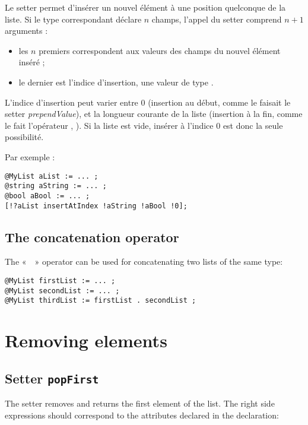 Le setter  permet d'insérer un nouvel élément à une position quelconque de la liste. Si le type  correspondant déclare $n$ champs, l'appel du setter comprend $n+1$ arguments :
\begin{itemize}
  \item les $n$ premiers correspondent aux valeurs des champs du nouvel élément inséré ;
  \item le dernier est l'indice d'insertion, une valeur de type .
\end{itemize}

L'indice d'insertion peut varier entre $0$ (insertion au début, comme le faisait le setter \emph{prependValue}), et la longueur courante de la liste (insertion à la fin, comme le fait l'opérateur \galgas{+=}, ). Si la liste est vide, insérer à l'indice $0$ est donc la seule possibilité.

Par exemple :

\begin{lstlisting}[language=galgas]
@MyList aList := ... ;
@string aString := ... ;
@bool aBool := ... ;
[!?aList insertAtIndex !aString !aBool !0];
\end{lstlisting}

\subsection{The concatenation operator}

The «~~» operator can be used for concatenating two lists of the same type:


\begin{lstlisting}[language=galgas]
@MyList firstList := ... ;
@MyList secondList := ... ;
@MyList thirdList := firstList . secondList ;
\end{lstlisting}

\section{Removing elements}

\subsection{Setter \texttt{popFirst}}


The  setter removes and returns the first element of the list. The right side expressions should correspond to the attributes declared in the  declaration:\\

